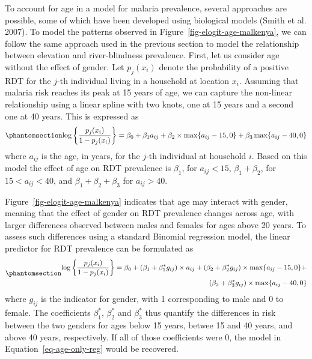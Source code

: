 \documentclass[
  letterpaper,
]{krantz}
\begin{document}
To account for age in a model for malaria prevalence, several approaches
are possible, some of which have been developed using biological models
(Smith et al. 2007). To model the patterns observed in
Figure~\ref{fig-elogit-age-malkenya}, we can follow the same approach
used in the previous section to model the relationship between elevation
and river-blindness prevalence. First, let us consider age without the
effect of gender. Let \(p_{j}(x_i)\) denote the probability of a
positive RDT for the \(j\)-th individual living in a household at
location \(x_i\). Assuming that malaria risk reaches its peak at 15
years of age, we can capture the non-linear relationship using a linear
spline with two knots, one at 15 years and a second one at 40 years.
This is expressed as
\begin{equation}\phantomsection\label{eq-age-only-reg}{
\begin{aligned}
\log\left\{\frac{p_{j}(x_i)}{1-p_j(x_i)}\right\} = \beta_{0} + \beta_{1}a_{ij}+\beta_{2} \times\max\{a_{ij}-15, 0\} + \beta_{3}\max\{a_{ij}-40, 0\}
\end{aligned}
}\end{equation} where \(a_{ij}\) is the age, in years, for the \(j\)-th
individual at household \(i\). Based on this model the effect of age on
RDT prevalence is \(\beta_{1}\), for \(a_{ij} < 15\),
\(\beta_{1}+\beta_{2}\), for \(15 < a_{ij} < 40\), and
\(\beta_{1}+\beta_{2}+\beta_{3}\) for \(a_{ij} > 40\).

Figure~\ref{fig-elogit-age-malkenya} indicates that age may interact
with gender, meaning that the effect of gender on RDT prevalence changes
across age, with larger differences observed between males and females
for ages above 20 years. To assess such differences using a standard
Binomial regression model, the linear predictor for RDT prevalence can
be formulated as
\begin{equation}\phantomsection\label{eq-age-inter-reg}{
\begin{aligned}
\log\left\{\frac{p_{j}(x_i)}{1-p_j(x_i)}\right\} = \beta_{0} + (\beta_{1} + \beta_{1}^*g_{ij})\times a_{ij}+(\beta_{2} + \beta_{2}^*g_{ij})\times\max\{a_{ij}-15, 0\} + \\
(\beta_{3} + \beta_{3}^*g_{ij}) \times \max\{a_{ij}-40, 0\}
\end{aligned}
}\end{equation} where \(g_{ij}\) is the indicator for gender, with 1
corresponding to male and 0 to female. The coefficients \(\beta_{1}^*\),
\(\beta_{2}^*\) and \(\beta_{3}^*\) thus quantify the differences in
risk between the two genders for ages below 15 years, betwee 15 and 40
years, and above 40 years, respectively. If all of those coefficients
were 0, the model in Equation~\ref{eq-age-only-reg} would be recovered.
\end{document}
